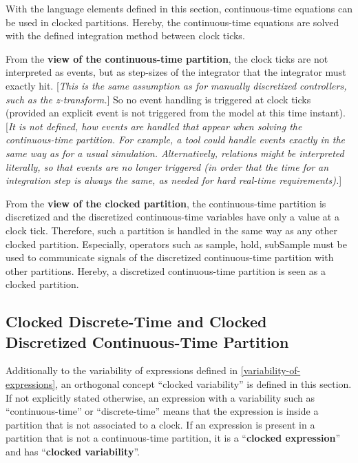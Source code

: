 \documentclass[10pt,a4paper]{report}
\def\doublelabel#1{\label{#1}\hypertarget{#1}{}}
\begin{document}
With the language elements defined in this section, continuous-time
equations can be used in clocked partitions. Hereby, the continuous-time
equations are solved with the defined integration method between clock
ticks.

From the \textbf{view of the continuous-time partition}, the clock ticks
are not interpreted as events, but as step-sizes of the integrator that
the integrator must exactly hit. {[}\emph{This is the same assumption as
for manually discretized controllers, such as the z-transform.}{]} So no
event handling is triggered at clock ticks (provided an explicit event
is not triggered from the model at this time instant). {[}\emph{It is
not defined, how events are handled that appear when solving the
continuous-time partition. For example, a tool could handle events
exactly in the same way as for a usual simulation. Alternatively,
relations might be interpreted literally, so that events are no longer
triggered (in order that the time for an integration step is always the
same, as needed for hard real-time requirements).}{]}

From the \textbf{view of the clocked partition}, the continuous-time
partition is discretized and the discretized continuous-time variables
have only a value at a clock tick. Therefore, such a partition is
handled in the same way as any other clocked partition. Especially,
operators such as sample, hold, subSample must be used to communicate
signals of the discretized continuous-time partition with other
partitions. Hereby, a discretized continuous-time partition is seen as a
clocked partition.

\subsection{Clocked Discrete-Time and Clocked Discretized Continuous-Time Partition}\doublelabel{clocked-discrete-time-and-clocked-discretized-continuous-time-partition}

Additionally to the variability of expressions defined in \ref{variability-of-expressions},
an orthogonal concept ``clocked variability'' is defined in this
section. If not explicitly stated otherwise, an expression with a
variability such as ``continuous-time'' or ``discrete-time'' means that
the expression is inside a partition that is not associated to a clock.
If an expression is present in a partition that is not a continuous-time
partition, it is a ``\textbf{clocked expression}'' and has
``\textbf{clocked variability}''.
\end{document}
